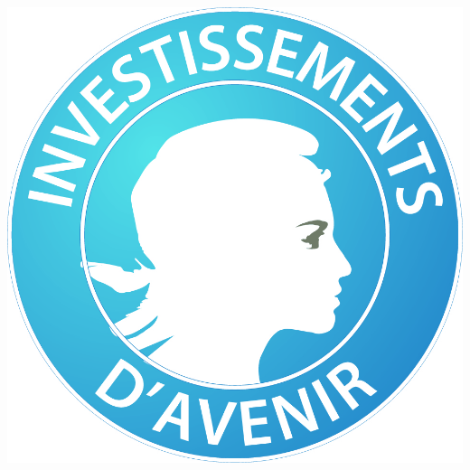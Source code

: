 \documentclass{beamer}
\begin{document}
\begin{frame}
\begin{columns}
\begin{column}{.15\textwidth}
{                \includegraphics{logo_pia}
            }
        \end{column}
    \end{columns}
\end{frame}
\end{document}
